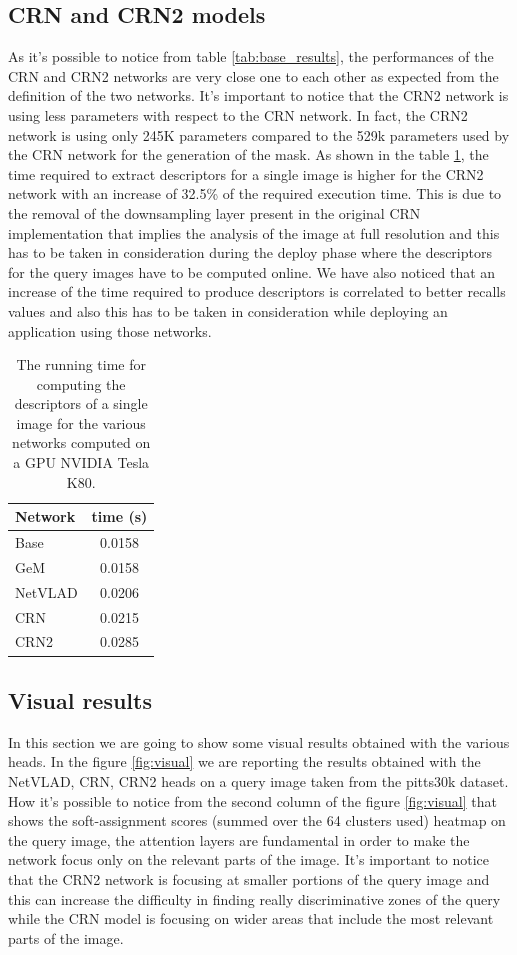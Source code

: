 \documentclass[10pt,twocolumn,letterpaper]{article}
\begin{document}
\subsection{CRN and CRN2 models}
As it's possible to notice from table \ref{tab:base_results}, the performances of the CRN and CRN2 networks are very close one to each other as expected
from the definition of the two networks. It's important to notice that the CRN2 network is using less parameters with respect to the CRN network. In fact,
the CRN2 network is using only 245K parameters compared to the 529k parameters used by the CRN network for the generation of the mask.
As shown in the table \ref{tab:time}, the time required to extract descriptors for a single image is higher for the CRN2 network with an increase of 32.5\% 
of the required execution time. This is due to the removal of the downsampling layer present in the original CRN implementation that implies the analysis of the image 
at full resolution and this 
has to be taken in consideration during the deploy phase where the descriptors for the query images have to be computed online. We have also noticed that an increase
of the time required to produce descriptors is correlated to better recalls values and also this has to be taken in consideration while deploying an 
application using those networks.

\begin{table}
   \centering
   \begin{tabular}{|l|c|}
      \hline
      Network     &  time (s)\\\hline
      Base        &  0.0158\\
      GeM         &  0.0158\\
      NetVLAD     &  0.0206\\
      CRN         &  0.0215\\
      CRN2        &  0.0285\\\hline
   \end{tabular}
   \caption{The running time for computing the descriptors of a single image for the various networks computed on a GPU NVIDIA Tesla K80.}
   \label{tab:time}
\end{table}

\subsection{Visual results}
In this section we are going to show some visual results obtained with the various heads. In the figure \ref{fig:visual} we are 
reporting the results obtained with the NetVLAD, CRN, CRN2 heads on a query image taken from the pitts30k dataset. How it's 
possible to notice from the second column of the figure \ref{fig:visual} that shows the soft-assignment scores (summed over the 64 clusters used) heatmap 
on the query 
image, the attention layers are fundamental in order to make the network focus only on the relevant parts of the image.
It's important to notice that the CRN2 network is focusing at smaller portions of the query image and this can increase the difficulty in finding 
really discriminative zones of the query while the CRN model is focusing on wider areas that include the most relevant parts of the image.
\end{document}
